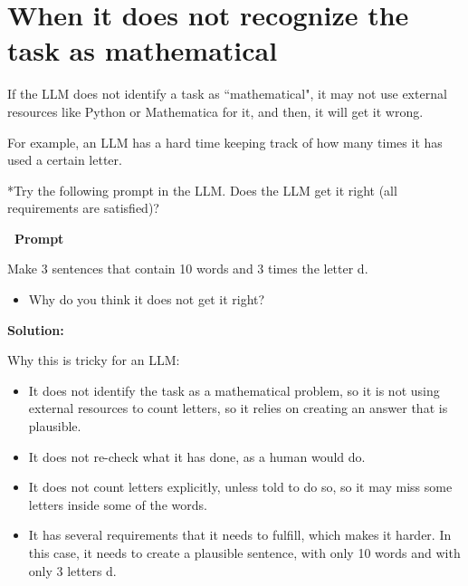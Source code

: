 \documentclass[12pt]{article}
\makeatletter
\newcounter{question}
\newlength\questionheight
\newcommand{\question}{\@ifstar{\question@text}{\question@field}}
\newcommand{\question@heading}[1]{%
  \refstepcounter{question}%
  \vspace{0.3cm}%
  \noindent\textbf{\faEdit\ Question \thequestion: #1}%
}
\newcommand{\question@text}[1]{%
  \question@heading{#1}%
}
\newcommand{\question@field}[2][\questionheight]{%
  \question@heading{#2}%
 \\[0.3em] \begin{Form}
    \TextField[
      name=Q\thequestion,
      multiline=true,
      width=\linewidth,
      height=#1,
      charsize=10pt,
      bordercolor={0 0 0},
      borderwidth=1.8,
      backgroundcolor={1 1 1}
    ]{}
  \end{Form}
  \vspace{0.3cm}%
}
\newenvironment{solution}{%
  \begin{solutionbox}\textbf{Solution:}
}{%
  \end{solutionbox}
}
\makeatother
\begin{document}
\section*{When it does not recognize the task as mathematical}

If the LLM does not identify a task as ``mathematical", it may not use external resources like Python or Mathematica for it, and then, it will get it wrong.

For example, an LLM has a hard time keeping track of how many times it has used a certain letter.

\question*{Try the following prompt in the LLM. Does the LLM get it right (all requirements are satisfied)?}

\vspace{0.3cm}
\textcolor{maincolor}{\textbf{\faCopy\ Prompt}}\nopagebreak
\begin{promptbox}
Make 3 sentences that contain 10 words and 3 times the letter d.
\end{promptbox}

\begin{Form}
\begin{itemize}
    \item Why do you think it does not get it right? \\[0.2cm]
\TextField[name=whywrong,width=\linewidth,height=2cm,multiline=true, bordercolor={0 0 0}]{}
\end{itemize}
\end{Form}

\begin{solution}
Why this is tricky for an LLM:
\begin{itemize}
\item It does not identify the task as a mathematical problem, so it is not using external resources to count letters, so it relies on creating an answer that is plausible.
\item It does not re-check what it has done, as a human would do.

\item It does not count letters explicitly, unless told to do so, so it may miss some letters inside some of the words.

\item It has several requirements that it needs to fulfill, which makes it harder. In this case, it needs to create a plausible sentence, with only 10 words and with only 3 letters d.
\end{itemize}
\end{solution}
\end{document}
